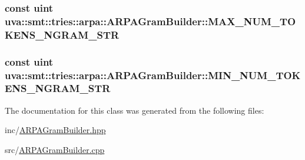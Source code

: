 \subsubsection[{M\+A\+X\+\_\+\+N\+U\+M\+\_\+\+T\+O\+K\+E\+N\+S\+\_\+\+N\+G\+R\+A\+M\+\_\+\+S\+T\+R}]{\setlength{\rightskip}{0pt plus 5cm}const uint uva\+::smt\+::tries\+::arpa\+::\+A\+R\+P\+A\+Gram\+Builder\+::\+M\+A\+X\+\_\+\+N\+U\+M\+\_\+\+T\+O\+K\+E\+N\+S\+\_\+\+N\+G\+R\+A\+M\+\_\+\+S\+T\+R\hspace{0.3cm}{\ttfamily [protected]}}\label{classuva_1_1smt_1_1tries_1_1arpa_1_1_a_r_p_a_gram_builder_afd40395f976805a4835bc0b03e26cee2}
\hypertarget{classuva_1_1smt_1_1tries_1_1arpa_1_1_a_r_p_a_gram_builder_a6ab807fa7fd956beabb58d8f275050d0}{}
\subsubsection[{M\+I\+N\+\_\+\+N\+U\+M\+\_\+\+T\+O\+K\+E\+N\+S\+\_\+\+N\+G\+R\+A\+M\+\_\+\+S\+T\+R}]{\setlength{\rightskip}{0pt plus 5cm}const uint uva\+::smt\+::tries\+::arpa\+::\+A\+R\+P\+A\+Gram\+Builder\+::\+M\+I\+N\+\_\+\+N\+U\+M\+\_\+\+T\+O\+K\+E\+N\+S\+\_\+\+N\+G\+R\+A\+M\+\_\+\+S\+T\+R\hspace{0.3cm}{\ttfamily [protected]}}\label{classuva_1_1smt_1_1tries_1_1arpa_1_1_a_r_p_a_gram_builder_a6ab807fa7fd956beabb58d8f275050d0}


The documentation for this class was generated from the following files\+:\begin{DoxyCompactItemize}
\item 
inc/\hyperlink{_a_r_p_a_gram_builder_8hpp}{A\+R\+P\+A\+Gram\+Builder.\+hpp}\item 
src/\hyperlink{_a_r_p_a_gram_builder_8cpp}{A\+R\+P\+A\+Gram\+Builder.\+cpp}\end{DoxyCompactItemize}
